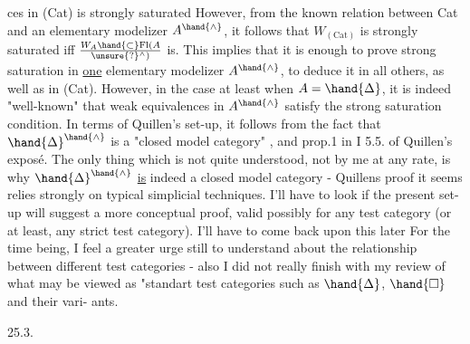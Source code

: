 
ces in (Cat) is strongly saturated However, from the known relation
between Cat and an elementary modelizer $A^{\hand{\wedge}}$, it follows that $W_{(\mathrm{Cat})}$ is
strongly saturated iff $W_A \hand{\subset} \mathrm{Fl}(A\over{\unsure{?}}{{}^{\wedge}})$ is. This implies that it is enough to
prove strong saturation in \uline{one} elementary modelizer $A^{\hand{\wedge}}$, to deduce it in
all others, as well as in (Cat). However, in the case at least when
$A = \hand{\Delta}$, it is indeed "well-known" that  weak equivalences in $A^{\hand{\wedge}}$ satisfy the
strong saturation condition. In terms of Quillen's set-up, it follows
from the fact that $\hand{\Delta}^{\hand{\wedge}}$ is a "closed model category" , and prop.1 in I 5.5.
of Quillen's expos\'e. The only thing which is not quite understood, not by
me at any rate, is why $\hand{\Delta}^{\hand{\wedge}}$ \uline{is} indeed a closed model category - Quillens
proof it seems relies strongly on typical simplicial techniques. I'll have
to look if the present set-up will suggest a more conceptual proof, valid
possibly for any test category (or at least, any strict test category).
I'll have to come back upon this later  For the time being, I feel
a greater urge still to understand about the relationship between different
test categories\hand{,} - also\hand{,} I did not really finish with my review of what
may be viewed as  "standart test categories such as $\hand{\Delta}$, $\hand{\square}$ and their vari-%
ants.

25.3.

